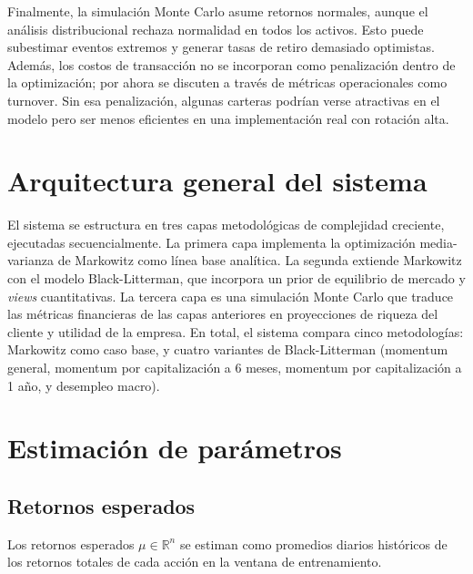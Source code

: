 Finalmente, la simulaci\'on Monte Carlo asume retornos normales, aunque el an\'alisis distribucional rechaza normalidad en todos los activos. Esto puede subestimar eventos extremos y generar tasas de retiro demasiado optimistas. Adem\'as, los costos de transacci\'on no se incorporan como penalizaci\'on dentro de la optimizaci\'on; por ahora se discuten a trav\'es de m\'etricas operacionales como turnover. Sin esa penalizaci\'on, algunas carteras podr\'ian verse atractivas en el modelo pero ser menos eficientes en una implementaci\'on real con rotaci\'on alta.


\section{Arquitectura general del sistema}

El sistema se estructura en tres capas metodol\'ogicas de complejidad
creciente, ejecutadas secuencialmente. La primera capa implementa la
optimizaci\'on media-varianza de Markowitz como l\'inea base anal\'itica. La
segunda extiende Markowitz con el modelo Black-Litterman, que incorpora un
prior de equilibrio de mercado y \textit{views} cuantitativas. La tercera capa
es una simulaci\'on Monte Carlo que traduce las m\'etricas financieras de las
capas anteriores en proyecciones de riqueza del cliente y utilidad de la
empresa. En total, el sistema compara cinco metodolog\'ias: Markowitz como caso
base, y cuatro variantes de Black-Litterman (momentum general, momentum por
capitalizaci\'on a 6 meses, momentum por capitalizaci\'on a 1 a\~no, y desempleo
macro).

\section{Estimaci\'on de par\'ametros}

\subsection{Retornos esperados}

Los retornos esperados $\mu \in \mathbb{R}^n$ se estiman como promedios
diarios hist\'oricos de los retornos totales de cada acci\'on en la ventana de
entrenamiento.

